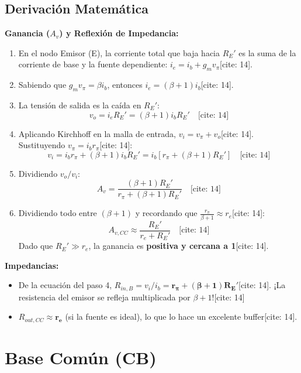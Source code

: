 \documentclass[11pt, a4paper]{article}
\begin{document}
\subsection{Derivación Matemática}
\textbf{Ganancia ($A_v$) y Reflexión de Impedancia:}
\begin{enumerate}
    \item En el nodo Emisor (E), la corriente total que baja hacia $R_E'$ es la suma de la corriente de base y la fuente dependiente: $i_e = i_b + g_m v_\pi$[cite: 14]. 
    \item Sabiendo que $g_m v_\pi = \beta i_b$, entonces $i_e = (\beta + 1) i_b$[cite: 14].
    \item La tensión de salida es la caída en $R_E'$: 
    $$ v_o = i_e R_E' = (\beta + 1) i_b R_E' \quad \text{[cite: 14]} $$
    \item Aplicando Kirchhoff en la malla de entrada, $v_i = v_\pi + v_o$[cite: 14]. Sustituyendo $v_\pi = i_b r_\pi$[cite: 14]:
    $$ v_i = i_b r_\pi + (\beta + 1) i_b R_E' = i_b [r_\pi + (\beta + 1) R_E'] \quad \text{[cite: 14]} $$
    \item Dividiendo $v_o / v_i$:
    $$ A_v = \frac{(\beta+1)R_E'}{r_\pi + (\beta+1)R_E'} \quad \text{[cite: 14]} $$
    \item Dividiendo todo entre $(\beta+1)$ y recordando que $\frac{r_\pi}{\beta+1} \approx r_e$[cite: 14]:
    $$ \boxed{A_{v,CC} \approx \frac{R_E'}{r_e + R_E'}} \quad \text{[cite: 14]} $$
    Dado que $R_E' \gg r_e$, la ganancia es \textbf{positiva y cercana a 1}[cite: 14].
\end{enumerate}

\textbf{Impedancias:}
\begin{itemize}
    \item De la ecuación del paso 4, $R_{in,B} = v_i / i_b = \mathbf{r_\pi + (\beta+1)R_E'}$[cite: 14]. ¡La resistencia del emisor se refleja multiplicada por $\beta+1$![cite: 14]
    \item $R_{out,CC} \approx \mathbf{r_e}$ (si la fuente es ideal), lo que lo hace un excelente buffer[cite: 14].
\end{itemize}

\newpage
\section{Base Común (CB)}
\end{document}
